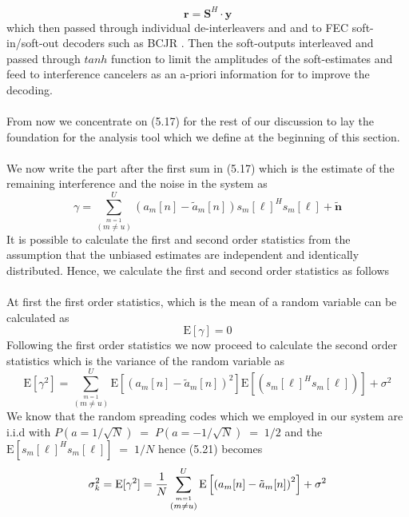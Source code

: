 \begin{equation}
\mathrm{\mathbf{r}}=\mathrm{\mathbf{S}}^H\cdot\mathrm{\mathbf{y}}%
\end{equation}
which then passed through individual de-interleavers and and to FEC soft-in/soft-out decoders such as BCJR \cite{BCJR}. Then the soft-outputs interleaved and passed through $tanh$ function to limit the amplitudes of the soft-estimates and feed to interference cancelers as an a-priori information for to improve the decoding.\\ \\
From now we concentrate on (5.17) for the rest of our discussion to lay the foundation for the analysis tool which we define at the beginning of this section.\\ \\
We now write the part after the first sum in (5.17) which is the estimate of the remaining interference and the noise in the system as
\begin{equation}
\gamma=\sum\limits_{\stackrel{m=1}{(m\neq u)}}^{U}\left({{a}}_m[n]-{{\tilde{a}}}_m[n]\right){{s}}_m[\ell]^H{{s}}_m[\ell]+\mathrm{\mathbf{\tilde{n}}}
\end{equation}
It is possible to calculate the first and second order statistics from the assumption that the unbiased estimates are independent and identically distributed. Hence, we calculate the first and second order statistics as follows\\ \\
At first the first order statistics, which is the mean of a random variable can be calculated as
\begin{equation}
\mathrm{E}[\gamma]=0
\end{equation}
Following the first order statistics we now proceed to calculate the second order statistics which is the variance of the random variable as
\begin{equation}
\mathrm{E}[\gamma^2]=\sum\limits_{\stackrel{m=1}{(m\neq u)}}^{U}\mathrm{E}\left[\left({{a}}_m[n]-{{\tilde{a}}}_m[n]\right)^2\right]\mathrm{E}\left[({{s}}_m[\ell]^H{{s}}_m[\ell])\right]+\sigma^2
\end{equation}
We know that the random spreading codes which we employed in our system are i.i.d with $P(a=1/\sqrt{N})\;=\;P(a=-1/\sqrt{N})\;=\;1/2$ and the $\mathrm{E}\left[{{s}}_m[\ell]^H{{s}}_m[\ell]\right]\;=\;1/N$
hence (5.21) becomes
\begin{equation}
\sigma^2_k=\mathrm{E}[\gamma^2]=\frac{\hbox{$1$}}{\hbox{$N$}}\sum\limits_{\stackrel{m=1}{(m\neq u)}}^{U}\mathrm{E}\left[\left({{a}}_m[n]-{{\tilde{a}}}_m[n]\right)^2\right]+\sigma^2
\end{equation}
